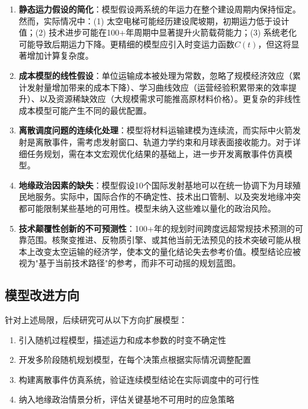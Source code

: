 \begin{enumerate}
    \item \textbf{静态运力假设的简化}：模型假设两系统的年运力在整个建设周期内保持恒定。然而，实际情况中：(1) 太空电梯可能经历建设爬坡期，初期运力低于设计值；(2) 技术进步可能在100+年周期中显著提升火箭载荷能力；(3) 系统老化可能导致后期运力下降。更精细的模型应引入时变运力函数$C(t)$，但这将显著增加计算复杂度。
    
    \item \textbf{成本模型的线性假设}：单位运输成本被处理为常数，忽略了规模经济效应（累计发射量增加带来的成本下降）、学习曲线效应（运营经验积累带来的效率提升）、以及资源稀缺效应（大规模需求可能推高原材料价格）。更复杂的非线性成本模型可能产生不同的最优配置。
    
    \item \textbf{离散调度问题的连续化处理}：模型将材料运输建模为连续流，而实际中火箭发射是离散事件，需考虑发射窗口、轨道力学约束和月球表面接收能力。对于详细任务规划，需在本文宏观优化结果的基础上，进一步开发离散事件仿真模型。
    
    \item \textbf{地缘政治因素的缺失}：模型假设10个国际发射基地可以在统一协调下为月球殖民地服务。实际中，国际合作的不确定性、技术出口管制、以及突发地缘冲突都可能限制某些基地的可用性。模型未纳入这些难以量化的政治风险。
    
    \item \textbf{技术颠覆性创新的不可预测性}：100+年的规划时间跨度远超常规技术预测的可靠范围。核聚变推进、反物质引擎、或其他当前无法预见的技术突破可能从根本上改变太空运输的经济学，使本文的量化结论失去参考价值。模型结论应被视为"基于当前技术路径"的参考，而非不可动摇的规划蓝图。
\end{enumerate}

\subsection{模型改进方向}

针对上述局限，后续研究可从以下方向扩展模型：

\begin{enumerate}
    \item 引入随机过程模型，描述运力和成本参数的时变不确定性
    \item 开发多阶段随机规划模型，在每个决策点根据实际情况调整配置
    \item 构建离散事件仿真系统，验证连续模型结论在实际调度中的可行性
    \item 纳入地缘政治情景分析，评估关键基地不可用时的应急策略
\end{enumerate}
